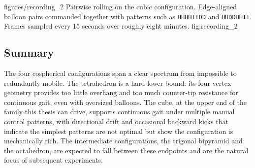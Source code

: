 \figcap
{figures/recording_2}
{Pairwise rolling on the cubic configuration.}
{Edge-aligned balloon pairs commanded together with patterns such as \texttt{HHHHIIDD} and \texttt{HHDDHHII}. Frames sampled every 15 seconds over roughly eight minutes.}
{fig:recording_2}
{\linewidth}

\subsection{Summary}
\label{subsec:configuration-test-summary}

The four cospherical configurations span a clear spectrum from impossible to redundantly mobile. The tetrahedron is a hard lower bound: its four-vertex geometry provides too little overhang and too much counter-tip resistance for continuous gait, even with oversized balloons. The cube, at the upper end of the family this thesis can drive, supports continuous gait under multiple manual control patterns, with directional drift and occasional backward kicks that indicate the simplest patterns are not optimal but show the configuration is mechanically rich. The intermediate configurations, the trigonal bipyramid and the octahedron, are expected to fall between these endpoints and are the natural focus of subsequent experiments.
